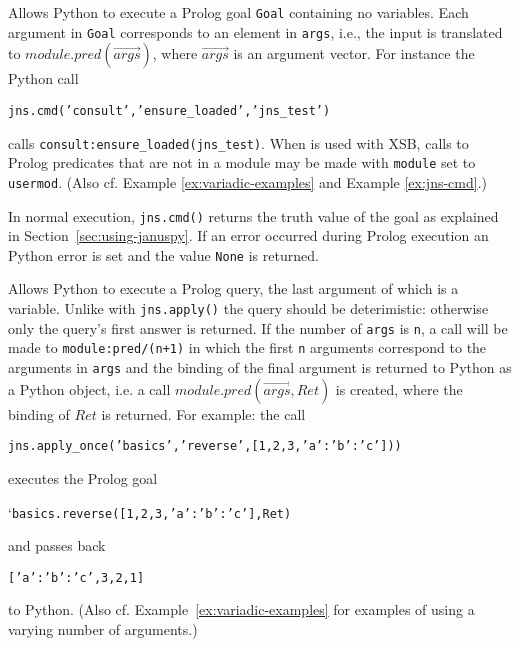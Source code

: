 \begin{description}

%
  Allows Python to execute a Prolog goal {\tt Goal} containing no
  variables.  Each argument in {\tt Goal} corresponds to an element in
  {\tt args}, i.e., the input is translated to
  $module.pred(\overrightarrow{args})$, where $\overrightarrow{args}$ is an
  argument vector.  For instance the Python call

  {\tt jns.cmd('consult','ensure\_loaded','jns\_test')}

  calls {\tt consult:ensure\_loaded(jns\_test)}.  When \janus{} is
  used with XSB, calls to Prolog predicates that are not in a module
  may be made with {\tt module} set to {\tt usermod}. (Also
  cf. Example \ref{ex:variadic-examples} and Example
  \ref{ex:jns-cmd}.)

  In normal execution, {\tt jns.cmd()} returns the truth value of the
  goal as explained in Section~\ref{sec:using-januspy}.  If an error
  occurred during Prolog execution an Python error is set and the value
  {\tt None} is returned.
  
%
  Allows Python to execute a Prolog query, the last argument of which
  is a variable. Unlike with {\tt jns.apply()} the query should be
  deterimistic: otherwise only the query's first answer is
  returned. If the number of {\tt args} is {\tt n}, a call will be
  made to {\tt module:pred/(n+1)} in which the first {\tt n} arguments
  correspond to the arguments in {\tt args} and the binding of the
  final argument is returned to Python as a Python object,
  i.e. a call
  $module.pred(\overrightarrow{args},Ret)$ is created, where the
  binding of $Ret$ is returned.
  For example: the call

  {\tt jns.apply\_once('basics','reverse',[1,2,3,{'a':{'b':'c'}}]))}

  \noindent
  executes the Prolog goal

  `{\tt basics.reverse([1,2,3,{'a':{'b':'c'}}],Ret)}

  \noindent
  and passes back

  {\tt [{'a':{'b':'c'}},3,2,1]}

  \noindent
  to Python.  (Also cf. Example~\ref{ex:variadic-examples} for
  examples of using a varying number of arguments.)


\end{description}
